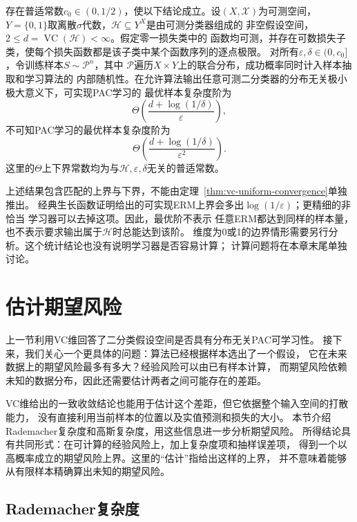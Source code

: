 \begin{theorem}[二分类的最优样本复杂度阶]
\label{thm:binary-optimal-sample-complexity}
存在普适常数$c_0\in(0,1/2)$，使以下结论成立。设$(X,\mathcal X)$为可测空间，
$Y=\{0,1\}$取离散$\sigma$代数，$\mathcal H\subseteq Y^X$是由可测分类器组成的
非空假设空间，$2\leq d=\operatorname{VC}(\mathcal H)<\infty$。假定零一损失类中的
函数均可测，并存在可数损失子类，使每个损失函数都是该子类中某个函数序列的逐点极限。
对所有$\varepsilon,\delta\in(0,c_0]$，令训练样本$S\sim\mathcal P^n$，其中
$\mathcal P$遍历$X\times Y$上的联合分布，成功概率同时计入样本抽取和学习算法的
内部随机性。在允许算法输出任意可测二分类器的分布无关极小极大意义下，可实现PAC学习的
最优样本复杂度阶为
\[
 \Theta\left(\frac{d+\log(1/\delta)}{\varepsilon}\right),
\]
不可知PAC学习的最优样本复杂度阶为
\[
 \Theta\left(\frac{d+\log(1/\delta)}{\varepsilon^2}\right).
\]
这里的$\Theta$上下界常数均为与$\mathcal H,\varepsilon,\delta$无关的普适常数。
\end{theorem}

上述结果包含匹配的上界与下界，不能由定理~\ref{thm:vc-uniform-convergence}单独推出。
经典生长函数证明给出的可实现ERM上界会多出$\log(1/\varepsilon)$；更精细的非恰当
学习器可以去掉这项。因此，最优阶不表示
任意ERM都达到同样的样本量，也不表示要求输出属于$\mathcal H$时总能达到该阶。
维度为0或1的边界情形需要另行分析。这个统计结论也没有说明学习器是否容易计算；
计算问题将在本章末尾单独讨论。

\section{估计期望风险}
\label{sec:rademacher-complexity}

上一节利用VC维回答了二分类假设空间是否具有分布无关PAC可学习性。
接下来，我们关心一个更具体的问题：算法已经根据样本选出了一个假设，
它在未来数据上的期望风险最多有多大？经验风险可以由已有样本计算，
而期望风险依赖未知的数据分布，因此还需要估计两者之间可能存在的差距。

VC维给出的一致收敛结论也能用于估计这个差距，但它依据整个输入空间的打散能力，
没有直接利用当前样本的位置以及实值预测和损失的大小。
本节介绍Rademacher复杂度和高斯复杂度，用这些信息进一步分析期望风险。
所得结论具有共同形式：在可计算的经验风险上，加上复杂度项和抽样误差项，
得到一个以高概率成立的期望风险上界。这里的“估计”指给出这样的上界，
并不意味着能够从有限样本精确算出未知的期望风险。

\subsection{Rademacher复杂度}

